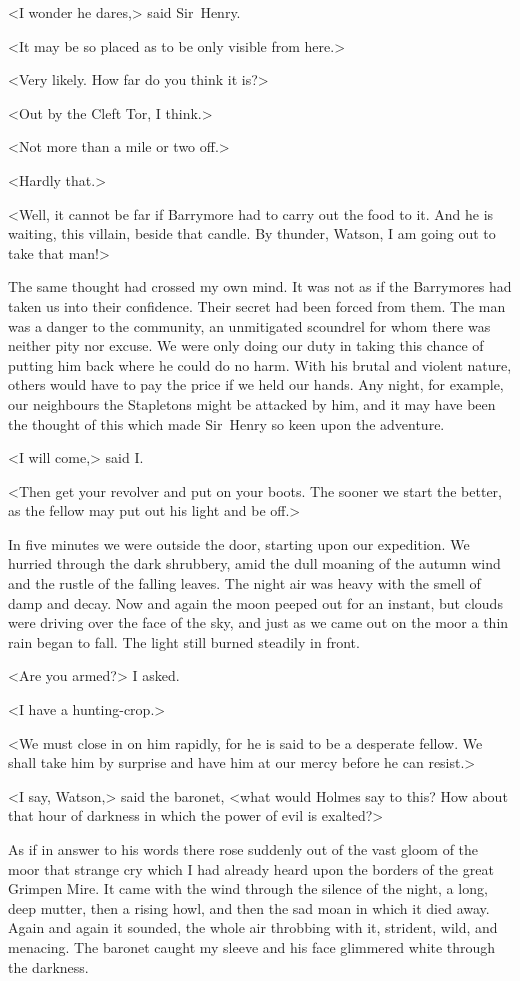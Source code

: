 <I wonder he dares,> said Sir~Henry.

<It may be so placed as to be only visible from here.>

<Very likely. How far do you think it is?>

<Out by the Cleft Tor, I think.>

<Not more than a mile or two off.>

<Hardly that.>

<Well, it cannot be far if Barrymore had to carry out the food to it. And he is waiting, this villain, beside that candle. By thunder, Watson, I am going out to take that man!>

The same thought had crossed my own mind. It was not as if the Barrymores had taken us into their confidence. Their secret had been forced from them. The man was a danger to the community, an unmitigated scoundrel for whom there was neither pity nor excuse. We were only doing our duty in taking this chance of putting him back where he could do no harm. With his brutal and violent nature, others would have to pay the price if we held our hands. Any night, for example, our neighbours the Stapletons might be attacked by him, and it may have been the thought of this which made Sir~Henry so keen upon the adventure.

<I will come,> said I\@.

<Then get your revolver and put on your boots. The sooner we start the better, as the fellow may put out his light and be off.>

In five minutes we were outside the door, starting upon our expedition. We hurried through the dark shrubbery, amid the dull moaning of the autumn wind and the rustle of the falling leaves. The night air was heavy with the smell of damp and decay. Now and again the moon peeped out for an instant, but clouds were driving over the face of the sky, and just as we came out on the moor a thin rain began to fall. The light still burned steadily in front.

<Are you armed?> I asked.

<I have a hunting-crop.>

<We must close in on him rapidly, for he is said to be a desperate fellow. We shall take him by surprise and have him at our mercy before he can resist.>

<I say, Watson,> said the baronet, <what would Holmes say to this? How about that hour of darkness in which the power of evil is exalted?>

As if in answer to his words there rose suddenly out of the vast gloom of the moor that strange cry which I had already heard upon the borders of the great Grimpen Mire. It came with the wind through the silence of the night, a long, deep mutter, then a rising howl, and then the sad moan in which it died away. Again and again it sounded, the whole air throbbing with it, strident, wild, and menacing. The baronet caught my sleeve and his face glimmered white through the darkness.



